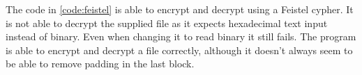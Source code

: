The code in \autoref{code:feistel} is able to encrypt and decrypt using a Feistel cypher. It is not able to decrypt the supplied file as it expects hexadecimal text input instead of binary. Even when changing it to read binary it still fails. The program is able to encrypt and decrypt a file correctly, although it doesn't always seem to be able to remove padding in the last block.

